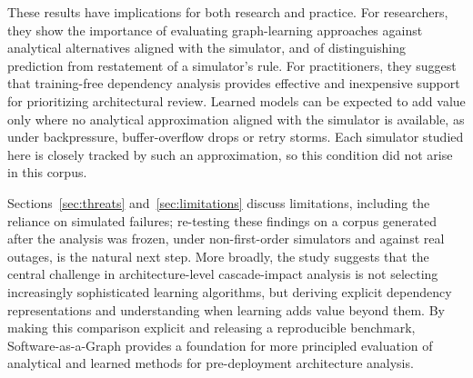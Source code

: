 These results have implications for both research and practice. For researchers, they show the importance of evaluating graph-learning approaches against analytical alternatives aligned with the simulator, and of distinguishing prediction from restatement of a simulator's rule. For practitioners, they suggest that training-free dependency analysis provides effective and inexpensive support for prioritizing architectural review. Learned models can be expected to add value only where no analytical approximation aligned with the simulator is available, as under backpressure, buffer-overflow drops or retry storms. Each simulator studied here is closely tracked by such an approximation, so this condition did not arise in this corpus.

Sections~\ref{sec:threats} and~\ref{sec:limitations} discuss limitations, including the reliance on simulated failures; re-testing these findings on a corpus generated after the analysis was frozen, under non-first-order simulators and against real outages, is the natural next step. More broadly, the study suggests that the central challenge in architecture-level cascade-impact analysis is not selecting increasingly sophisticated learning algorithms, but deriving explicit dependency representations and understanding when learning adds value beyond them. By making this comparison explicit and releasing a reproducible benchmark, Software-as-a-Graph provides a foundation for more principled evaluation of analytical and learned methods for pre-deployment architecture analysis.
